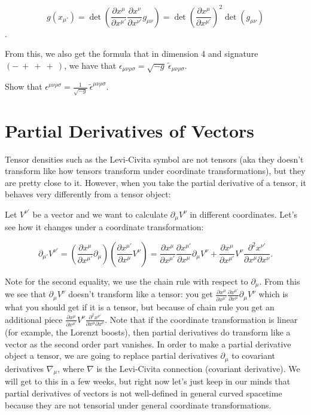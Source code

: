 \documentclass[10pt]{article}
\newcommand{\xm}{x^\mu}
\newcommand{\xmp}{x^{\mu'}}
\newcommand{\xn}{x^\nu}
\newcommand{\xnp}{x^{\nu'}}
\newcommand{\epu}{\epsilon_{\mu \nu \rho \sigma}}
\newcommand{\eput}{\tilde{\epsilon}_{\mu \nu \rho \sigma}}
\newcommand{\gmn}{g_{\mu \nu}}
\newcommand{\dxm}{\frac {\partial \xm}{\partial \xmp}}
\newcommand{\dxminverse}{\frac {\partial \xmp}{\partial \xm}}
\newcommand{\dxn}{\frac {\partial \xn}{\partial \xnp}}
\begin{document}
$$g(x_{\mu'}) = \det( \frac {\partial \xm}{\partial \xmp} \dxn \gmn) 
	 = \det (\dxm)^2 \det(\gmn)$$.  

From this, we also get the formula that in dimension 4 and signature $(-\ +\ +\ +\ )$, we have that $\epu = \sqrt{-g} \ \eput$.

\begin{exercise}
Show that ${\epsilon}^{\mu \nu \rho \sigma} =  \frac{1}{\sqrt{-g}}\  \tilde{\epsilon} ^{\mu \nu \rho \sigma}.$


\end{exercise}

\section{Partial Derivatives of Vectors}\label{sec:class_style}

Tensor densities such as the Levi-Civita symbol are not tensors (aka they doesn't transform like how tensors transform under coordinate transformations), but they are pretty close to it. However, when you take the partial derivative of a tensor, it behaves very differently from a tensor object:

Let $V^{\nu'}$ be a vector and we want to calculate $\partial_{\mu} V^{\nu}$ in different coordinates.  Let's see how it changes under a coordinate transformation:

$$\partial_{\mu'} V^{\nu'} = (\dxm \partial_\mu)(\dxminverse V^{\nu}) = \dxm \dxminverse \partial_{\mu} V^{\nu} + 
	\dxm V^{\nu} \frac{\partial^2 \xnp}{\partial \xm \partial \xn}.$$

Note for the second equality, we use the chain rule with respect to $\partial_{\mu}$. From this we see that $\partial_{\mu} V^{\nu}$ doesn't transform like a tensor: you get $\dxm \dxminverse \partial_{\mu} V^{\nu}$ which is what you should get if it is a tensor, but because of chain rule you get an additional piece $\dxm V^{\nu} \frac{\partial^2 \xnp}{\partial \xm \partial \xn}$. Note that if the coordinate transformation is linear (for example, the Lorenzt boosts), then partial derivatives do transform like a vector as the second order part vanishes. In order to make a partial derivative object a tensor, we are going to replace partial derivatives $\partial_\mu$ to covariant derivatives $\nabla_\mu$, where $\nabla$ is the Levi-Civita connection (covariant derivative). We will get to this in a few weeks, but right now let's just keep in our minds that partial derivatives of vectors is not well-defined in general curved spacetime because they are not tensorial under general coordinate transformations.
\end{document}
